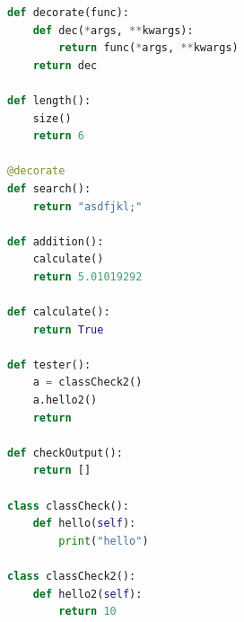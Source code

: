 
\begin{figure}[t!]
\begin{lstlisting}[language = Python, frame = single, caption = Contents of fake.py, label = fakepy]
def decorate(func):
    def dec(*args, **kwargs):
        return func(*args, **kwargs)
    return dec

def length():
    size()
    return 6

@decorate
def search():
    return "asdfjkl;"

def addition():
    calculate()
    return 5.01019292

def calculate():
    return True

def tester():
    a = classCheck2()
    a.hello2()
    return

def checkOutput():
    return []

class classCheck():
    def hello(self):
        print("hello")

class classCheck2():
    def hello2(self):
        return 10
\end{lstlisting}
\end{figure}
